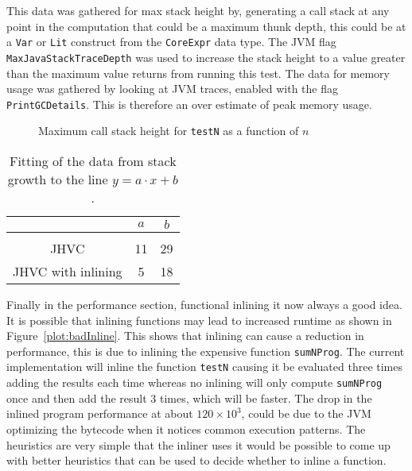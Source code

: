 \documentclass[float=false, crop=false]{standalone}
\newlength\gwidth
\newlength\gheight
\newcommand{\importMGraph}[3]{\setlength{\gwidth}{#2}\setlength{\gheight}{#3}{#1}}
\begin{document}
This data was gathered for max stack height by, 
generating a call stack at any point in the computation that could 
be a maximum thunk depth, this could be at a \texttt{Var} or \texttt{Lit} construct from
the \texttt{CoreExpr} data type. The JVM flag \texttt{MaxJavaStackTraceDepth} was used to increase
the stack height to a value greater than the maximum value returns from running this test.
The data for memory usage was gathered by looking at JVM traces, 
enabled with the flag \texttt{PrintGCDetails}. This is therefore an over estimate of
peak memory usage. 

\begin{figure}
  \centering
  \importMGraph{plotCallStackGrowth}{0.96\textwidth}{0.3\textwidth}
  \caption{Maximum call stack height for \texttt{testN} as a function of $n$}
  \label{plot:stackSize}
\end{figure}

\begin{table}
  \centering
  \begin{tabular}{ c | c c}
  & $a$ & $b$\\
  \hline\\
  JHVC & 11 & 29 \\
  JHVC with inlining & 5 & 18 
  \end{tabular}
  \caption{Fitting of the data from stack growth to the line $y = a\cdot x + b$.}
  \label{table:stackGrowth}
\end{table}


\begin{figure}
  \centering
  \importMGraph{memUsed}{0.96\textwidth}{0.3\textwidth}
  \caption[Memory used in \texttt{testN} as a function of $n$]
  \label{plot:memUsed}
\end{figure}

Finally in the performance section, functional inlining it now always a good idea.
It is possible that inlining functions may lead to increased runtime as shown in 
Figure~\ref{plot:badInline}. 
This shows that inlining can cause a reduction in performance, 
this is due to inlining the expensive function \texttt{sumNProg}. The current implementation 
will inline the function \texttt{testN} causing it be evaluated three times adding the results each time
whereas no inlining will only compute \texttt{sumNProg} once and then add the result 3 times, 
which will be faster. The drop in the inlined program performance at about $120 \times 10^3$, 
could be due to the JVM optimizing the bytecode when it notices common execution patterns.
The heuristics are very simple that the inliner uses it would be possible to 
come up with better heuristics that can be used to decide whether to inline a function.
\end{document}
